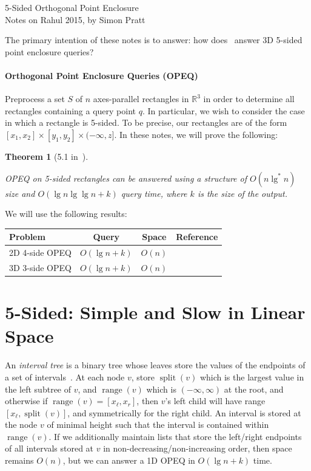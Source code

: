 \documentclass[letterpaper,12pt,twocolumn]{article}
\DeclareMathOperator{\splt}{split}
\DeclareMathOperator{\range}{range}
\newcommand{\BigOh}[1]{O\!\left(#1\right)}
\newcommand\IR{\mathbb{R}}
\newcommand\bounds[1]{[#1]}
\newcommand\lbounds[1]{(#1]} %
\theoremstyle{plain}
\newtheorem{theorem}{Theorem}
\begin{document}
{\noindent\Large 5-Sided Orthogonal Point Enclosure}\\
{\noindent Notes on Rahul 2015, by Simon Pratt}

The primary intention of these notes is to answer: how
does~\cite{saladi2015improved} answer 3D 5-sided point enclosure
queries?

\paragraph{Orthogonal Point Enclosure Queries (OPEQ)}
Preprocess a set $S$ of $n$ axes-parallel rectangles in $\IR^3$ in
order to determine all rectangles containing a query point $q$.  In
particular, we wish to consider the case in which a rectangle is
5-sided.  To be precise, our rectangles are of the form
$\bounds{x_1,x_2} \times \bounds{y_1, y_2} \times
\lbounds{-\infty,z}$.  In these notes, we will prove the following:

\begin{theorem}[5.1 in~\cite{saladi2015improved}]\label{thm:51}

  OPEQ on 5-sided rectangles can be answered using a structure of
  $\BigOh{n\lg^* n}$ size and $\BigOh{\lg n \lg\lg n + k}$ query time,
  where $k$ is the size of the output.

\end{theorem}

We will use the following results:

\noindent\begin{tabular}{lccr}
    \toprule
    Problem & Query & Space & Reference \\
    \midrule
    2D 4-side OPEQ & $\BigOh{\lg n + k}$ & $\BigOh{n}$ & \cite{chazelle1986filtering} \\ %
    3D 3-side OPEQ & $\BigOh{\lg n + k}$ & $\BigOh{n}$ & \cite{afshani2008dominance} \\ %
    \bottomrule
\end{tabular}

\section{5-Sided: Simple and Slow in Linear Space}

An \emph{interval tree} is a binary tree whose leaves store the values
of the endpoints of a set of intervals~\cite{edelsbrunner1983new}.  At
each node $v$, store $\splt(v)$ which is the largest value in the left
subtree of $v$, and $\range(v)$ which is $(-\infty,\infty)$ at the
root, and otherwise if $\range(v) = [x_\ell, x_r]$, then $v$'s left
child will have range $[x_\ell, \splt(v)]$, and symmetrically for the
right child.  An interval is stored at the node $v$ of minimal height
such that the interval is contained within $\range(v)$.  If we
additionally maintain lists that store the left/right endpoints of all
intervals stored at $v$ in non-decreasing/non-increasing order, then
space remains $\BigOh{n}$, but we can answer a 1D OPEQ in $\BigOh{\lg
  n + k}$ time.
\end{document}
